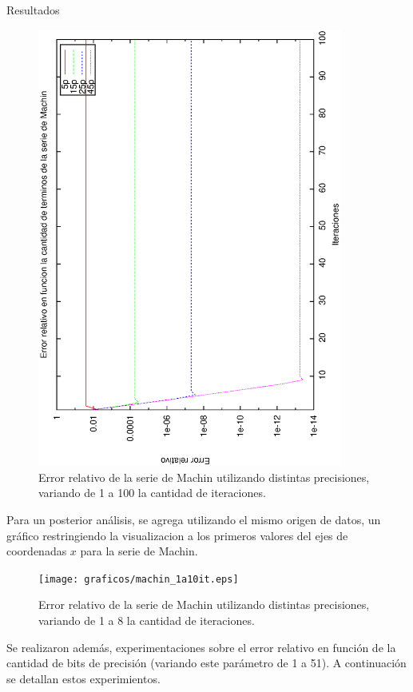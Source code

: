 \begin{section}{Resultados}
	\begin{figure}[H]
	  \centering
		\includegraphics[width=10cm,angle=-90]{graficos/machin_1a100it.eps}
	  \caption{Error relativo de la serie de Machin utilizando distintas precisiones, variando de 1 a 100 la cantidad de iteraciones.}
	  \label{fig:machin_100it}
	\end{figure}
	
	Para un posterior análisis, se agrega utilizando el mismo origen de datos, un gráfico restringiendo la visualizacion a los primeros valores del ejes de coordenadas $x$ para la serie de Machin.
	
	\VSP	
	\begin{figure}[H]
	  \centering
		\texttt{[image: graficos/machin\_1a10it.eps]}
	  \caption{Error relativo de la serie de Machin utilizando distintas precisiones, variando de 1 a 8 la cantidad de iteraciones.}
	  \label{fig:machin_10it}
	\end{figure}
	
	\VSP	

	Se realizaron además, experimentaciones sobre el error relativo en función de la cantidad de bits de precisión (variando este parámetro de 1 a 51). A continuación se detallan estos experimientos.
	

\end{section}
